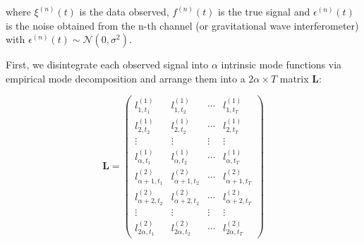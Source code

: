 \documentclass[onecolumn, groupedaddress, 10pt]{revtex4-1}
\begin{document}

where $\xi^{(n)}(t)$ is the data observed, $f^{(n)}(t)$ is the true signal and $\epsilon^{(n)}(t)$ is the noise obtained from the n-th channel (or gravitational wave interferometer) with $\epsilon^{(n)}(t) \sim \mathcal{N}(0,\sigma^2)$.

First, we disintegrate each observed signal into $\alpha$ intrinsic mode functions via empirical mode decomposition and arrange them into a $2 \alpha \times T$ matrix $\mathbf{L}$:

\begin{equation}
\mathbf{L} = \left( \begin{array}{cccc}
l_{1,t_1}^{(1)} & l_{1,t_2}^{(1)} & \cdots & l_{1,t_T}^{(1)} \\
l_{2,t_2}^{(1)} & l_{2,t_2}^{(1)} & \cdots & l_{2,t_T}^{(1)} \\
\vdots & \vdots & \vdots & \vdots \\
l_{\alpha,t_1}^{(1)} & l_{\alpha ,t_2}^{(1)} & \cdots & l_{\alpha,t_T}^{(1)} \\
l_{\alpha+1,t_1}^{(2)} & l_{\alpha+1,t_2}^{(2)} & \cdots & l_{\alpha+1,t_T}^{(2)} \\
l_{\alpha+2,t_2}^{(2)} & l_{\alpha+2,t_2}^{(2)} & \cdots & l_{\alpha+2,t_T}^{(2)} \\
\vdots & \vdots & \vdots & \vdots \\
l_{2\alpha,t_1}^{(2)} & l_{2\alpha,t_2}^{(2)} & \cdots & l_{2\alpha,t_T}^{(2)}
\end{array} \right)
\end{equation}
\end{document}
